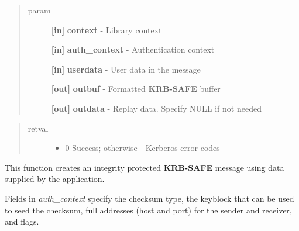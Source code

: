 \documentclass[letterpaper,10pt,english]{sphinxmanual}
\begin{document}
\begin{fulllineitems}
\label{appdev/refs/api/krb5_mk_safe:c.krb5_mk_safe}
\end{fulllineitems}

\begin{quote}\begin{description}
\item[{param}] \leavevmode
\textbf{{[}in{]}} \textbf{context} - Library context

\textbf{{[}in{]}} \textbf{auth\_context} - Authentication context

\textbf{{[}in{]}} \textbf{userdata} - User data in the message

\textbf{{[}out{]}} \textbf{outbuf} - Formatted \textbf{KRB-SAFE} buffer

\textbf{{[}out{]}} \textbf{outdata} - Replay data. Specify NULL if not needed

\end{description}\end{quote}
\begin{quote}\begin{description}
\item[{retval}] \leavevmode\begin{itemize}
\item {} 
0   Success; otherwise - Kerberos error codes

\end{itemize}

\end{description}\end{quote}

This function creates an integrity protected \textbf{KRB-SAFE} message using data supplied by the application.

Fields in \emph{auth\_context} specify the checksum type, the keyblock that can be used to seed the checksum, full addresses (host and port) for the sender and receiver, and  flags.
\end{document}

